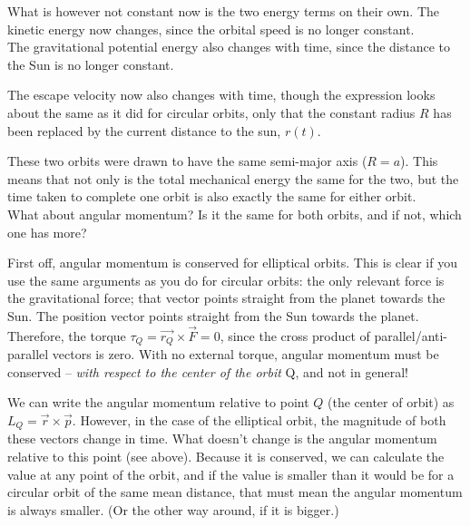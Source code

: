 What is however not constant now is the two energy terms on their own. The kinetic energy now changes, since the orbital speed is no longer constant.\\
The gravitational potential energy also changes with time, since the distance to the Sun is no longer constant.

The escape velocity now also changes with time, though the expression looks about the same as it did for circular orbits, only that the constant radius $R$ has been replaced by the current distance to the sun, $r(t)$.

\begin{figure}[H]
  \centering
{}
\end{figure}


These two orbits were drawn to have the same semi-major axis ($R = a$). This means that not only is the total mechanical energy the same for the two, but the time taken to complete one orbit is also exactly the same for either orbit.\\
What about angular momentum? Is it the same for both orbits, and if not, which one has more?

First off, angular momentum is conserved for elliptical orbits. This is clear if you use the same arguments as you do for circular orbits: the only relevant force is the gravitational force; that vector points straight from the planet towards the Sun. The position vector points straight from the Sun towards the planet. Therefore, the torque $\tau_Q = \vec{r_Q} \times \vec{F} = 0$, since the cross product of parallel/anti-parallel vectors is zero. With no external torque, angular momentum must be conserved -- \emph{with respect to the center of the orbit} Q, and not in general!

We can write the angular momentum relative to point $Q$ (the center of orbit) as $L_Q = \vec{r} \times \vec{p}$. However, in the case of the elliptical orbit, the magnitude of both these vectors change in time.  What doesn't change is the angular momentum relative to this point (see above). Because it is conserved, we can calculate the value at any point of the orbit, and if the value is smaller than it would be for a circular orbit of the same mean distance, that must mean the angular momentum is always smaller. (Or the other way around, if it is bigger.)

